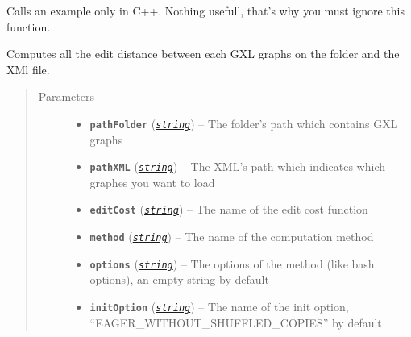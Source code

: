 \documentclass[letterpaper,10pt,english]{sphinxmanual}
\begin{document}

\begin{fulllineitems}
\label{doc:PythonGedLib.appel}
Calls an example only in C++. Nothing usefull, that's why you must ignore this function.

\end{fulllineitems}


\begin{fulllineitems}
\label{doc:PythonGedLib.computeEditDistanceOnGXlGraphs}
Computes all the edit distance between each GXL graphs on the folder and the XMl file.
\begin{quote}\begin{description}
\item[{Parameters}] \leavevmode\begin{itemize}
\item {} 
\textbf{\texttt{pathFolder}} (\href{https://docs.python.org/3/library/string.html\#module-string}{\emph{\texttt{string}}}) -- The folder's path which contains GXL graphs

\item {} 
\textbf{\texttt{pathXML}} (\href{https://docs.python.org/3/library/string.html\#module-string}{\emph{\texttt{string}}}) -- The XML's path which indicates which graphes you want to load

\item {} 
\textbf{\texttt{editCost}} (\href{https://docs.python.org/3/library/string.html\#module-string}{\emph{\texttt{string}}}) -- The name of the edit cost function

\item {} 
\textbf{\texttt{method}} (\href{https://docs.python.org/3/library/string.html\#module-string}{\emph{\texttt{string}}}) -- The name of the computation method

\item {} 
\textbf{\texttt{options}} (\href{https://docs.python.org/3/library/string.html\#module-string}{\emph{\texttt{string}}}) -- The options of the method (like bash options), an empty string by default

\item {} 
\textbf{\texttt{initOption}} (\href{https://docs.python.org/3/library/string.html\#module-string}{\emph{\texttt{string}}}) -- The name of the init option, ``EAGER\_WITHOUT\_SHUFFLED\_COPIES'' by default


\end{itemize}
\end{description}
\end{quote}
\end{fulllineitems}
\end{document}
